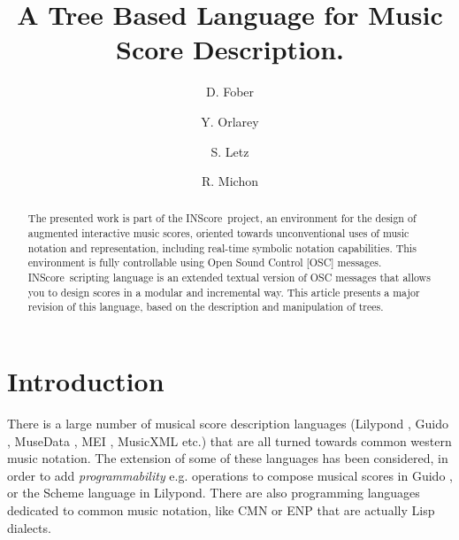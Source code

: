 \documentclass[runningheads,a4paper]{llncs}
\newcommand{\IS}		{INScore}
\begin{document}
\title{A Tree Based Language for Music Score Description.}

\author{D. Fober \and
Y. Orlarey \and
S. Letz \and R. Michon}
%
%


\maketitle

%
\begin{abstract}
The presented work is part of the \IS\ project, an environment for the design of augmented interactive music scores, oriented towards unconventional uses of music notation and representation, including real-time symbolic notation capabilities. This environment is fully controllable using Open Sound Control [OSC] messages. \IS\ scripting language is an extended textual version of OSC messages that allows you to design scores in a modular and incremental way. This article presents a major revision of this language, based on the description and manipulation of trees.

\end{abstract}
%

\section{Introduction}\label{sec:introduction}

There is a large number of musical score description languages (Lilypond \cite{lilypond03}, Guido \cite{hoos98}, MuseData \cite{Hewlett97}, MEI \cite{Roland_2002}, MusicXML \cite{good01} etc.) that are all turned towards common western music notation. 
The extension of some of these languages has been considered, in order to add \textit{programmability} e.g. operations to compose musical scores in Guido \cite{fober12b}, or the Scheme language in Lilypond.
There are also programming languages dedicated to common music notation, like CMN \cite{Schottstaedt97} or ENP 
\cite{KUUSK06} that are actually Lisp dialects. %
\end{document}
